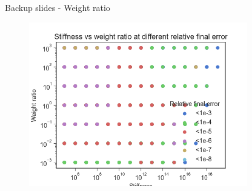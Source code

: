 \documentclass[9pt]{beamer}
\begin{document}
\begin{frame}[fragile]{Backup slides - Weight ratio}
\begin{figure}
    \centering
    \includegraphics[width=0.85\textwidth]{stiffness_vs_weight_at_dif_error.png}
    \label{fig:my_label}
\end{figure}
\end{frame}
\end{document}
